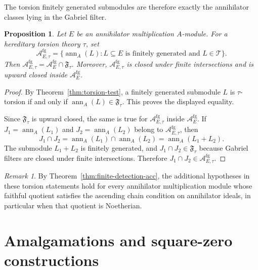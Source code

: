 \documentclass[11pt]{amsart}
\theoremstyle{plain}
\newtheorem{proposition}[theorem]{Proposition}
\theoremstyle{definition}
\theoremstyle{remark}
\newtheorem{remark}[theorem]{Remark}
\newcommand{\ann}{\operatorname{ann}}
\numberwithin{equation}{section}
\begin{document}
The torsion finitely generated submodules are therefore exactly the annihilator
classes lying in the Gabriel filter.

\begin{proposition}
\label{prop:torsion-annihilator-classes}
Let $E$ be an annihilator multiplication $A$-module. For a hereditary
torsion theory $\tau$, set
\[
\mathcal A_{E,\tau}^{\operatorname{fg}}
=\{\ann_A(L):L\subseteq E\text{ is finitely generated and }L\in\mathcal T\}.
\]
Then
$\mathcal A_{E,\tau}^{\operatorname{fg}}=\mathcal A_E^{\operatorname{fg}}\cap\mathfrak F_\tau.$
Moreover, $\mathcal A_{E,\tau}^{\operatorname{fg}}$ is closed under finite
intersections and is upward closed inside $\mathcal A_E^{\operatorname{fg}}$.
\end{proposition}

\begin{proof}
By Theorem~\ref{thm:torsion-test}, a finitely generated submodule $L$ is
$\tau$-torsion if and only if $\ann_A(L)\in\mathfrak F_\tau$. This proves the
displayed equality.

Since $\mathfrak F_\tau$ is upward closed, the same is true for
$\mathcal A_{E,\tau}^{\operatorname{fg}}$ inside
$\mathcal A_E^{\operatorname{fg}}$. If
$J_1=\ann_A(L_1)$ and $J_2=\ann_A(L_2)$ belong to
$\mathcal A_{E,\tau}^{\operatorname{fg}}$, then
\[
J_1\cap J_2=\ann_A(L_1)\cap\ann_A(L_2)=\ann_A(L_1+L_2).
\]
The submodule $L_1+L_2$ is finitely generated, and
$J_1\cap J_2\in\mathfrak F_\tau$ because Gabriel filters are closed under finite
intersections. Therefore
$J_1\cap J_2\in\mathcal A_{E,\tau}^{\operatorname{fg}}$.
\end{proof}

\begin{remark}
By Theorem~\ref{thm:finite-detection-acc}, the additional hypotheses
in these torsion statements hold for every annihilator multiplication
module whose faithful quotient satisfies the ascending chain condition
on annihilator ideals, in particular when that quotient is Noetherian.
\end{remark}

\section{Amalgamations and square-zero constructions}
\label{sec:amalgamation}
\end{document}
